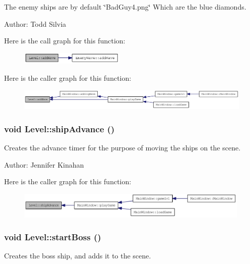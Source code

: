 The enemy ships are by default \char`\"{}BadGuy4.png\char`\"{} Which are the blue diamonds.

Author: Todd Silvia 

Here is the call graph for this function:\nopagebreak
\begin{figure}[H]
\begin{center}
\leavevmode
\includegraphics[width=141pt]{class_level_a80431ecc50b0496e4fb11cda0b92905a_cgraph}
\end{center}
\end{figure}


Here is the caller graph for this function:\nopagebreak
\begin{figure}[H]
\begin{center}
\leavevmode
\includegraphics[width=390pt]{class_level_a80431ecc50b0496e4fb11cda0b92905a_icgraph}
\end{center}
\end{figure}
\hypertarget{class_level_ab15684c527719fa1568c3c0e90e71714}{
\subsubsection[{shipAdvance}]{\setlength{\rightskip}{0pt plus 5cm}void Level::shipAdvance ()}}
\label{class_level_ab15684c527719fa1568c3c0e90e71714}
Creates the advance timer for the purpose of moving the ships on the scene.

Author: Jennifer Kinahan 

Here is the caller graph for this function:\nopagebreak
\begin{figure}[H]
\begin{center}
\leavevmode
\includegraphics[width=315pt]{class_level_ab15684c527719fa1568c3c0e90e71714_icgraph}
\end{center}
\end{figure}
\hypertarget{class_level_ae82e5c51006651333ba3ec36541ef12c}{
\subsubsection[{startBoss}]{\setlength{\rightskip}{0pt plus 5cm}void Level::startBoss ()}}
\label{class_level_ae82e5c51006651333ba3ec36541ef12c}
Creates the boss ship, and adds it to the scene.

